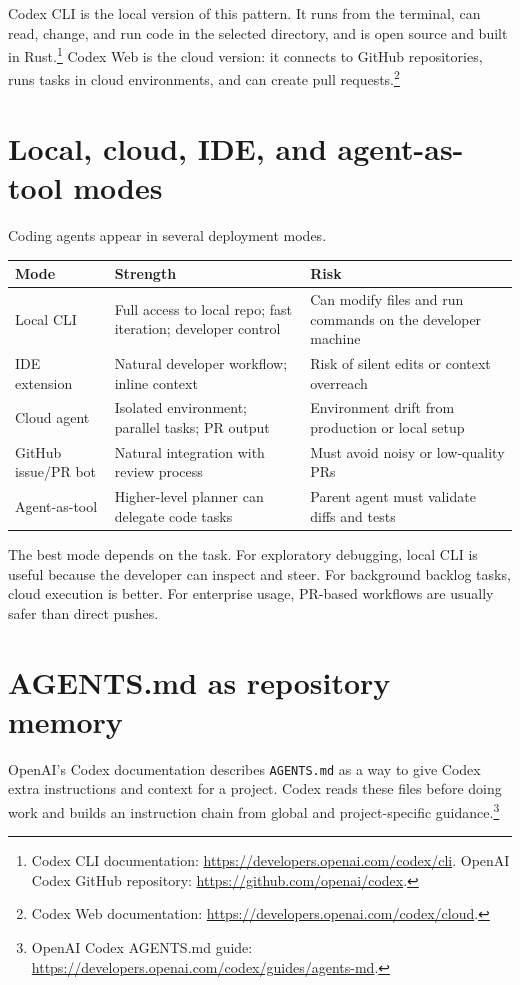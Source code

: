 Codex CLI is the local version of this pattern. It runs from the terminal, can read, change, and run code in the selected directory, and is open source and built in Rust.\footnote{Codex CLI documentation: \url{https://developers.openai.com/codex/cli}. OpenAI Codex GitHub repository: \url{https://github.com/openai/codex}.} Codex Web is the cloud version: it connects to GitHub repositories, runs tasks in cloud environments, and can create pull requests.\footnote{Codex Web documentation: \url{https://developers.openai.com/codex/cloud}.}

\section{Local, cloud, IDE, and agent-as-tool modes}

Coding agents appear in several deployment modes.

\begin{longtable}{p{}p{}p{}}
\toprule
\textbf{Mode} & \textbf{Strength} & \textbf{Risk} \\
\midrule
Local CLI & Full access to local repo; fast iteration; developer control & Can modify files and run commands on the developer machine \\
IDE extension & Natural developer workflow; inline context & Risk of silent edits or context overreach \\
Cloud agent & Isolated environment; parallel tasks; PR output & Environment drift from production or local setup \\
GitHub issue/PR bot & Natural integration with review process & Must avoid noisy or low-quality PRs \\
Agent-as-tool & Higher-level planner can delegate code tasks & Parent agent must validate diffs and tests \\
\bottomrule
\end{longtable}

The best mode depends on the task. For exploratory debugging, local CLI is useful because the developer can inspect and steer. For background backlog tasks, cloud execution is better. For enterprise usage, PR-based workflows are usually safer than direct pushes.

\section{AGENTS.md as repository memory}

OpenAI's Codex documentation describes \texttt{AGENTS.md} as a way to give Codex extra instructions and context for a project. Codex reads these files before doing work and builds an instruction chain from global and project-specific guidance.\footnote{OpenAI Codex AGENTS.md guide: \url{https://developers.openai.com/codex/guides/agents-md}.}


